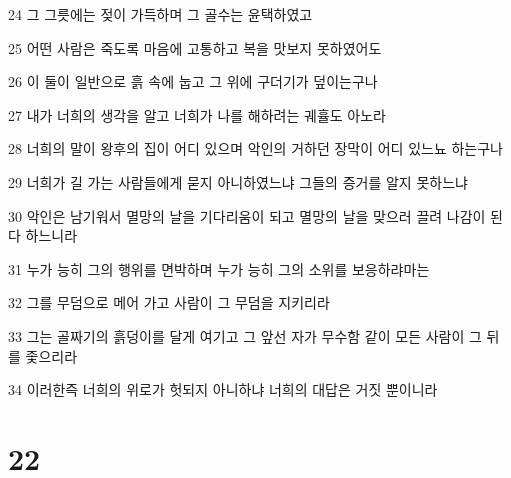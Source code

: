 \par 24 그 그릇에는 젖이 가득하며 그 골수는 윤택하였고
\par 25 어떤 사람은 죽도록 마음에 고통하고 복을 맛보지 못하였어도
\par 26 이 둘이 일반으로 흙 속에 눕고 그 위에 구더기가 덮이는구나
\par 27 내가 너희의 생각을 알고 너희가 나를 해하려는 궤휼도 아노라
\par 28 너희의 말이 왕후의 집이 어디 있으며 악인의 거하던 장막이 어디 있느뇨 하는구나
\par 29 너희가 길 가는 사람들에게 묻지 아니하였느냐 그들의 증거를 알지 못하느냐
\par 30 악인은 남기워서 멸망의 날을 기다리움이 되고 멸망의 날을 맞으러 끌려 나감이 된다 하느니라
\par 31 누가 능히 그의 행위를 면박하며 누가 능히 그의 소위를 보응하랴마는
\par 32 그를 무덤으로 메어 가고 사람이 그 무덤을 지키리라
\par 33 그는 골짜기의 흙덩이를 달게 여기고 그 앞선 자가 무수함 같이 모든 사람이 그 뒤를 좇으리라
\par 34 이러한즉 너희의 위로가 헛되지 아니하냐 너희의 대답은 거짓 뿐이니라

\chapter{22}

